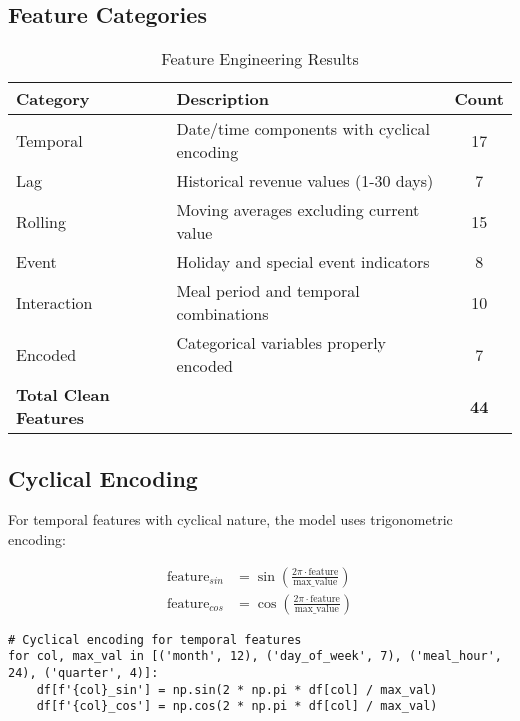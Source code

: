 \documentclass[12pt,a4paper]{article}
\begin{document}
\subsection{Feature Categories}

\begin{table}[h]
\centering
\begin{tabular}{@{}llc@{}}
\toprule
\textbf{Category} & \textbf{Description} & \textbf{Count} \\
\midrule
Temporal & Date/time components with cyclical encoding & 17 \\
Lag & Historical revenue values (1-30 days) & 7 \\
Rolling & Moving averages excluding current value & 15 \\
Event & Holiday and special event indicators & 8 \\
Interaction & Meal period and temporal combinations & 10 \\
Encoded & Categorical variables properly encoded & 7 \\
\midrule
\textbf{Total Clean Features} & & \textbf{44} \\
\bottomrule
\end{tabular}
\caption{Feature Engineering Results}
\end{table}

\subsection{Cyclical Encoding}

For temporal features with cyclical nature, the model uses trigonometric encoding:

\begin{equation}
\begin{aligned}
\text{feature}_{sin} &= \sin\left(\frac{2\pi \cdot \text{feature}}{\text{max\_value}}\right) \\
\text{feature}_{cos} &= \cos\left(\frac{2\pi \cdot \text{feature}}{\text{max\_value}}\right)
\end{aligned}
\end{equation}

\begin{lstlisting}[caption=Cyclical Encoding Implementation]
# Cyclical encoding for temporal features
for col, max_val in [('month', 12), ('day_of_week', 7), ('meal_hour', 24), ('quarter', 4)]:
    df[f'{col}_sin'] = np.sin(2 * np.pi * df[col] / max_val)
    df[f'{col}_cos'] = np.cos(2 * np.pi * df[col] / max_val)
\end{lstlisting}
\end{document}

